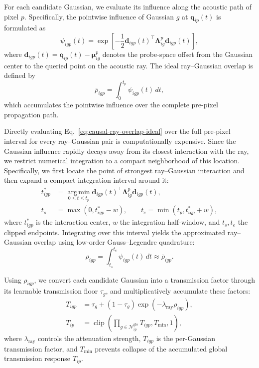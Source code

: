 For each candidate Gaussian, we evaluate its influence along the acoustic path
of pixel $p$. Specifically, the pointwise influence of Gaussian $g$ at
$\mathbf q_{ip}(t)$ is formulated as
\begin{equation}
\psi_{igp}(t)
=
\exp
\left[
-\frac{1}{2}
\mathbf d_{igp}(t)^\top
\boldsymbol\Lambda^{p}_{ig}
\mathbf d_{igp}(t)
\right],
\label{eq:global-ray-influence}
\end{equation}
where
$\mathbf d_{igp}(t)
=
\mathbf q_{ip}(t)-\boldsymbol\mu^{p}_{ig}$
denotes the probe-space offset from the Gaussian center to the queried point
on the acoustic ray. The ideal ray--Gaussian overlap is defined by
\begin{equation}
\bar{\rho}_{igp}
=
\int_{0}^{t_p}
\psi_{igp}(t)\,dt,
\label{eq:causal-ray-overlap-ideal}
\end{equation}
which accumulates the pointwise influence over the complete pre-pixel
propagation path.

Directly evaluating Eq.~\eqref{eq:causal-ray-overlap-ideal} over the full
pre-pixel interval for every ray--Gaussian pair is computationally expensive.
Since the Gaussian influence rapidly decays away from its closest interaction
with the ray, we restrict numerical integration to a compact neighborhood of
this location. Specifically, we first locate the point of strongest
ray--Gaussian interaction and then expand a compact integration interval around
it:
\begin{equation}
\begin{aligned}
t^{*}_{igp}
&=
\operatorname*{arg\,min}_{0\leq t\leq t_p}
\mathbf d_{igp}(t)^\top
\boldsymbol\Lambda^{p}_{ig}
\mathbf d_{igp}(t),\\
t_s
&=
\max(0,t^{*}_{igp}-w),
\qquad
t_e
=
\min(t_p,t^{*}_{igp}+w),
\end{aligned}
\label{eq:localized-ray-interval}
\end{equation}
where $t^{*}_{igp}$ is the interaction center, $w$ the integration half-window,
and $t_s,t_e$ the clipped endpoints. Integrating over this interval yields 
the approximated ray--Gaussian overlap using low-order Gauss--Legendre quadrature:
\begin{equation}
\rho_{igp}
=
\int_{t_s}^{t_e}
\psi_{igp}(t)\,dt
\approx
\bar{\rho}_{igp}.
\label{eq:localized-ray-overlap}
\end{equation}

Using $\rho_{igp}$, we convert each candidate Gaussian into a transmission
factor through its learnable transmission floor $\tau_g$, and multiplicatively
accumulate these factors:
\begin{equation}
\begin{aligned}
T_{igp}
&=
\tau_g
+
\left(
1-\tau_g
\right)
\exp
\left(
-\lambda_{\mathrm{ray}}\rho_{igp}
\right),\\
T_{ip}
&=
\operatorname{clip}
\left(
\prod_{g\in\mathcal N^{\mathrm{glo}}_{ip}}
T_{igp},
T_{\min},
1
\right),
\end{aligned}
\label{eq:global-transmission}
\end{equation}
where $\lambda_{\mathrm{ray}}$ controls the attenuation strength,
$T_{igp}$ is the per-Gaussian transmission factor, and $T_{\min}$ prevents
collapse of the accumulated global transmission response $T_{ip}$.

